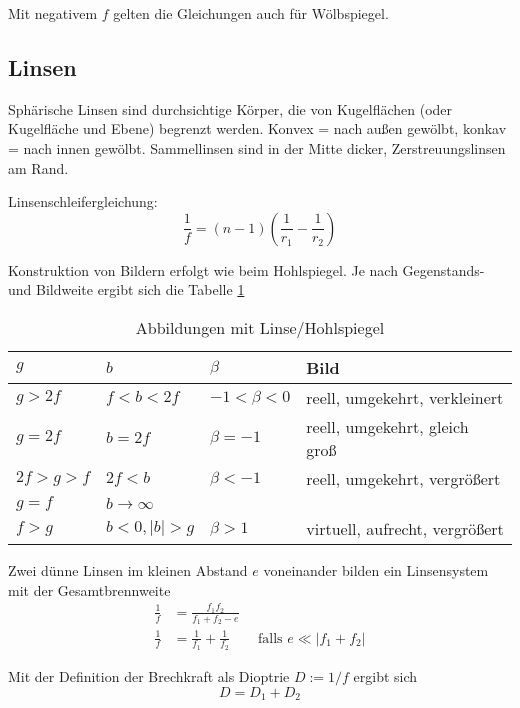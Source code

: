 \documentclass[a4paper]{scrartcl}
\begin{document}
Mit negativem $f$ gelten die Gleichungen auch für Wölbspiegel.

\subsection{Linsen}
Sphärische Linsen sind durchsichtige Körper, die von Kugelflächen (oder Kugelfläche und Ebene) begrenzt werden. Konvex = nach außen gewölbt, konkav = nach innen gewölbt. Sammellinsen sind in der Mitte dicker, Zerstreuungslinsen am Rand.

Linsenschleifergleichung:
\begin{equation*}
  \frac{1}{f} = (n-1)\left( \frac{1}{r_1} - \frac{1}{r_2} \right)
\end{equation*}

Konstruktion von Bildern erfolgt wie beim Hohlspiegel. Je nach Gegenstands- und Bildweite ergibt sich die Tabelle \ref{tab:AbbildungenLinse}

\begin{table}[htbp]
  \centering
  \begin{tabular}{llll}
    $g$ & $b$ & $\beta$ & Bild\\
    \hline
    $g > 2f$ & $f<b<2f$ & $-1 < \beta <0$ & reell, umgekehrt, verkleinert\\
    $g=2f$ & $b=2f$ & $\beta = -1$ & reell, umgekehrt, gleich groß\\
    $2f > g > f$ & $2f < b$ & $\beta < -1$ & reell, umgekehrt, vergrößert\\
    $g=f$ & $b \to \infty$\\
    $f > g$ & $b<0, |b| > g$ & $\beta > 1$ & virtuell, aufrecht, vergrößert
  \end{tabular}
  \caption{Abbildungen mit Linse/Hohlspiegel}
  \label{tab:AbbildungenLinse}
\end{table}

Zwei dünne Linsen im kleinen Abstand $e$ voneinander bilden ein Linsensystem mit der Gesamtbrennweite
\begin{align*}
  \frac{1}{f} & = \frac{f_1f_2}{f_1+f_2-e}\\
  \frac{1}{f} & = \frac{1}{f_1} + \frac{1}{f_2} \qquad\text{falls } e \ll |f_1+f_2|
\end{align*}

Mit der Definition der Brechkraft als Dioptrie $D := 1/f$ ergibt sich
\begin{equation*}
  D = D_1 + D_2
\end{equation*}
\end{document}
